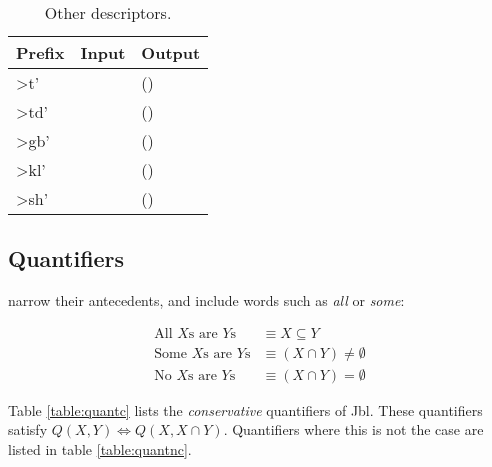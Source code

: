 \documentclass{book}
\newcommand{\lname}{Jbl}
\begin{document}
\begin{table}[h]
  \caption{Other descriptors.}
  \centering
  \begin{tabu}to 
    \textnormal{Prefix} & Input & Output \\
    \hline
    >t' &  &
    () \\
    >td' &  &
    () \\
    >gb' &  &
    () \\
    >kl' &  &
    () \\
    >sh' &  &
    () \\
  \end{tabu}
\end{table}

\subsection{Quantifiers}

 narrow their antecedents, and include words such as \emph{all} or \emph{some}:

\begin{align}
  \text{All $X$s are $Y$s} &\equiv X \subseteq Y \\
  \text{Some $X$s are $Y$s} &\equiv (X \cap Y) \neq \emptyset \\
  \text{No $X$s are $Y$s} &\equiv (X \cap Y) = \emptyset
\end{align}

Table \ref{table:quantc} lists the \emph{conservative} quantifiers of \lname. These quantifiers satisfy $Q(X, Y) \iff Q(X, X \cap Y)$. Quantifiers where this is not the case are listed in table \ref{table:quantnc}.
\end{document}
